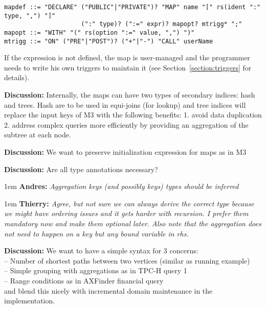 \documentclass[10pt]{article}
\newlength{\dlen}
\def\discuss#1{\par\hspace{2em}
\setlength{\dlen}{\textwidth}
\addtolength{\dlen}{-2em}
\begin{minipage}{\dlen}\footnotesize {\bf\color{red} Discussion:} #1\end{minipage}\par}
\def\say#1#2{\begingroup\par\leftskip1em {\bf #1:} \it #2\par\endgroup}
\begin{document}
\begin{verbatim}
mapdef ::= "DECLARE" ("PUBLIC"|"PRIVATE")? "MAP" name "[" rs(ident ":" type, ",") "]"
                     (":" type)? (":=" expr)? mapopt? mtrigg* ";" 
mapopt ::= "WITH" "(" rs(option ":=" value, ",") ")"
mtrigg ::= "ON" ("PRE"|"POST")? ("+"|"-") "CALL" userName
\end{verbatim}

If the expression is not defined, the map is user-managed and the programmer needs to write his own triggers to maintain it (see Section~\ref{section:triggers} for details).
\discuss{Internally, the maps can have two types of secondary indices: hash and trees. Hash are to be used in equi-joins (for lookup) and tree indices will replace the input keys of M3 with the following benefits: 1. avoid data duplication 2. address complex queries more efficiently by providing an aggregation of the subtree at each  node.}


\discuss{We want to preserve initialization expression for maps as in M3}
\discuss{Are all type annotations necessary?
	\say{Andres}{Aggregation keys (and possibly keys) types should be inferred}
	\say{Thierry}{Agree, but not sure we can always derive the correct type because we might have ordering issues and it gets harder with recursion. I prefer them mandatory now and make them optional later. Also note that the aggregation does not need to happen on a key but any bound variable in rhs.}}
\discuss{We want to have a simple syntax for 3 concerns:\\
-- Number of shortest paths between two vertices (similar as \cite{socialite} running example)\\
-- Simple grouping with aggregations as in TPC-H query 1\\
-- Range conditions as in AXFinder financial query\\
and blend this nicely with incremental domain maintenance in the implementation.}
\end{document}
